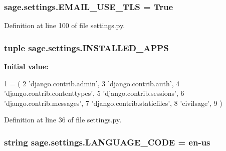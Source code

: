 \subsubsection[{E\+M\+A\+I\+L\+\_\+\+U\+S\+E\+\_\+\+T\+L\+S}]{\setlength{\rightskip}{0pt plus 5cm}sage.\+settings.\+E\+M\+A\+I\+L\+\_\+\+U\+S\+E\+\_\+\+T\+L\+S = True}\label{namespacesage_1_1settings_a0fe7c4174cb1b7d03f7b574ae1e5eed9}


Definition at line 100 of file settings.\+py.

\hypertarget{namespacesage_1_1settings_af48e999a4a4e7f8830d84ac4eb08df1a}{}
\subsubsection[{I\+N\+S\+T\+A\+L\+L\+E\+D\+\_\+\+A\+P\+P\+S}]{\setlength{\rightskip}{0pt plus 5cm}tuple sage.\+settings.\+I\+N\+S\+T\+A\+L\+L\+E\+D\+\_\+\+A\+P\+P\+S}\label{namespacesage_1_1settings_af48e999a4a4e7f8830d84ac4eb08df1a}
{\bfseries Initial value\+:}
\begin{DoxyCode}
1 = (
2     \textcolor{stringliteral}{'django.contrib.admin'},
3     \textcolor{stringliteral}{'django.contrib.auth'},
4     \textcolor{stringliteral}{'django.contrib.contenttypes'},
5     \textcolor{stringliteral}{'django.contrib.sessions'},
6     \textcolor{stringliteral}{'django.contrib.messages'},
7     \textcolor{stringliteral}{'django.contrib.staticfiles'},
8     \textcolor{stringliteral}{'civilsage'},
9 )
\end{DoxyCode}


Definition at line 36 of file settings.\+py.

\hypertarget{namespacesage_1_1settings_ac5b7a49ef37a25508ecb84453063821a}{}
\subsubsection[{L\+A\+N\+G\+U\+A\+G\+E\+\_\+\+C\+O\+D\+E}]{\setlength{\rightskip}{0pt plus 5cm}string sage.\+settings.\+L\+A\+N\+G\+U\+A\+G\+E\+\_\+\+C\+O\+D\+E = \textquotesingle{}en-\/us\textquotesingle{}}\label{namespacesage_1_1settings_ac5b7a49ef37a25508ecb84453063821a}


